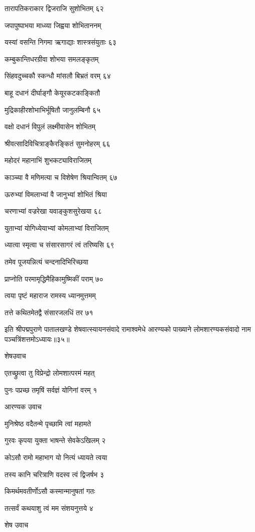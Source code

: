 तारापतिकराकार द्विजराजि सुशोभितम् ६२

जपापुष्पाभया माध्व्या जिह्वया शोभिताननम्

यस्यां वसन्ति निगमा ऋगाद्याः शास्त्रसंयुताः ६३

कम्बुकान्तिधरग्रीवा शोभया समलङ्कृतम्

सिंहवदुच्चकौ स्कन्धौ मांसलौ बिभ्रतं वरम् ६४

बाहू दधानं दीर्घाङ्गौ केयूरकटकाङ्कितौ

मुद्रिकाहीरशोभाभिर्भूषितौ जानुलम्बिनौ ६५

वक्षो दधानं विपुलं लक्ष्मीवासेन शोभितम्

श्रीवत्सादिविचित्राङ्कैरङ्कितं सुमनोहरम् ६६

महोदरं महानाभिं शुभकट्याविराजितम्

काञ्च्या वै मणिमत्या च विशेषेण श्रियान्वितम् ६७

ऊरुभ्यां विमलाभ्यां वै जानुभ्यां शोभितं श्रिया

चरणाभ्यां वज्ररेखा यवाङ्कुशसुरेखया ६८

युताभ्यां योगिध्येयाभ्यां कोमलाभ्यां विराजितम्

ध्यात्वा स्मृत्वा च संसारसागरं त्वं तरिष्यसि ६९

तमेव पूजयन्नित्यं चन्दनादिभिरिच्छया

प्राप्नोति परमामृद्धिमैहिकामुष्मिकीं पराम् ७०

त्वया पृष्टं महाराज रामस्य ध्यानमुत्तमम्

तत्ते कथितमेतद्वै संसारजलधिं तर ७१

इति श्रीपद्मपुराणे पातालखण्डे शेषवात्स्यायनसंवादे रामाश्वमेधे आरण्यको पाख्याने लोमशारण्यकसंवादो नाम पञ्चत्रिंशत्तमोऽध्यायः॥३५॥


शेषउवाच

एतच्छ्रुत्वा तु विप्रेन्द्रो लोमशात्परमं महत्

पुनः पप्रच्छ तमृषिं सर्वज्ञं योगिनां वरम् १

आरण्यक उवाच

मुनिश्रेष्ठ वदैतन्मे पृच्छामि त्वां महामते

गुरवः कृपया युक्ता भाषन्ते सेवकेऽखिलम् २

कोऽसौ रामो महाभाग यो नित्यं ध्यायते त्वया

तस्य कानि चरित्राणि वदस्व त्वं द्विजर्षभ ३

किमर्थमवतीर्णोऽसौ कस्मान्मानुषतां गतः

तत्सर्वं कथयाशु त्वं मम संशयनुत्तये ४

शेष उवाच

